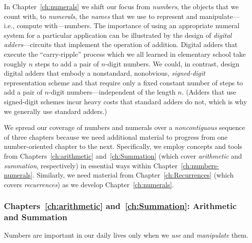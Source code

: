 \begin{itemize}
In Chapter~\ref{ch:numerals} we shift our focus from {\em numbers}, the objects that we count with, to {\em numerals}, the {\em names} that we use to represent and manipulate---i.e., compute with---numbers.  The importance of using an appropriate numeral system for a particular application can be illustrated by the design of {\em digital adders}---circuits that implement the operation of addition.  Digital adders that execute the ``carry-ripple'' process which we all learned in elementary school take roughly $n$ steps to add a pair of $n$-digit numbers.  We could, in contrast, design digital adders that embody a nonstandard, nonobvious, {\em signed-digit} representation scheme and that require only a fixed constant number of steps to add a pair of $n$-digit numbers---independent of the length $n$.  (Adders that use signed-digit schemes incur heavy costs that standard adders do not, which is why we generally use standard adders.)
\end{itemize}

\medskip

We spread our coverage of numbers and numerals over a {\em noncontiguous} sequence of three chapters because we need additional material to progress from one number-oriented chapter to the next.  Specifically, we employ concepts and tools from Chapters~\ref{ch:arithmetic} and~\ref{ch:Summation} (which cover {\em arithmetic} and {\em summation}, respectively) in essential ways within Chapter~\ref{ch:numbers-numerals}.  Similarly, we need material from Chapter~\ref{ch:Recurrences} (which covers {\em recurrences}) as we develop Chapter~\ref{ch:numerals}.


\subsubsection{Chapters~\ref{ch:arithmetic} and~\ref{ch:Summation}:
Arithmetic and Summation}

Numbers are important in our daily lives only when we {\em use} and {\em manipulate} them.

\smallskip

